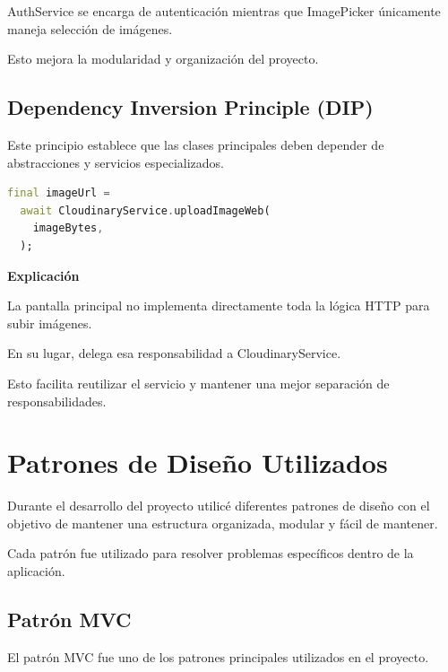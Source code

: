 \documentclass[12pt]{article}
\begin{document}
AuthService se encarga de autenticación mientras que ImagePicker únicamente maneja selección de imágenes.

Esto mejora la modularidad y organización del proyecto.


\subsection{Dependency Inversion Principle (DIP)}

Este principio establece que las clases principales deben depender de abstracciones y servicios especializados.

\begin{lstlisting}[language=Dart]
final imageUrl =
  await CloudinaryService.uploadImageWeb(
    imageBytes,
  );
\end{lstlisting}

\textbf{Explicación}

La pantalla principal no implementa directamente toda la lógica HTTP para subir imágenes.

En su lugar, delega esa responsabilidad a CloudinaryService.

Esto facilita reutilizar el servicio y mantener una mejor separación de responsabilidades.


\section{Patrones de Diseño Utilizados}

Durante el desarrollo del proyecto utilicé diferentes patrones de diseño con el objetivo de mantener una estructura organizada, modular y fácil de mantener.

Cada patrón fue utilizado para resolver problemas específicos dentro de la aplicación.


\subsection{Patrón MVC}

El patrón MVC fue uno de los patrones principales utilizados en el proyecto.
\end{document}
